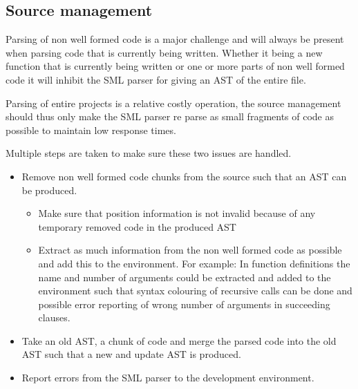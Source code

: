 \subsection{Source management}

Parsing of non well formed code is a major challenge and will always be present
when parsing code that is currently being written. Whether it being a new
function that is currently being written or one or more parts of non well formed
code it will inhibit the SML parser for giving an AST of the entire file. 

Parsing of entire projects is a relative costly operation, the source management
should thus only make the SML parser re parse as small fragments of code as
possible to maintain low response times. 


Multiple steps are taken to make sure these two issues are handled. 

\begin{itemize}
\item Remove non well formed code chunks from the source such that an AST can be
  produced.
  \begin{itemize}
  \item Make sure that position information is not invalid because of any
    temporary removed code in the produced AST
  \item Extract as much information from the non well formed code as possible
    and add this to the environment. For example: In function definitions the
    name and number of arguments could be extracted and added to the environment
    such that syntax colouring of recursive calls can be done and possible error
    reporting of wrong number of arguments in succeeding clauses.
  \end{itemize}

\item Take an old AST, a chunk of code and merge the parsed code into
  the old AST such that a new and update AST is produced.

\item Report errors from the SML parser to the development environment.

\end{itemize}



